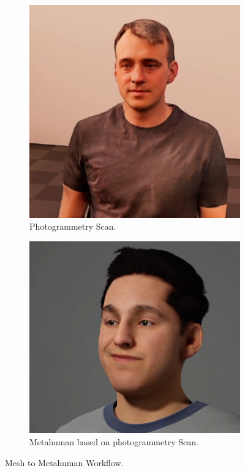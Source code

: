 \documentclass[
  a4paper,  %
  twoside,  %
  bibliography=totoc,
  headsepline,
  cleardoublepage=empty,
  parskip=half,
  draft=false
]{scrbook}
\begin{document}
\begin{figure}[h]
  \centering
  \begin{subfigure}[b]{0.45\textwidth}
    \includegraphics[width=\textwidth]{./graphics/unreal-engine/photogrammetry.png}
    \caption{Photogrammetry Scan.}
    \label{fig:head-photogrammetry-scan}
  \end{subfigure}
  \hfill
  \begin{subfigure}[b]{0.5\textwidth}
    \includegraphics[width=\textwidth]{./graphics/unreal-engine/Metahuman.png}
    \caption{Metahuman based on photogrammetry Scan.}
    \label{fig:metahuman-result}
  \end{subfigure}
  \caption{Mesh to Metahuman Workflow.}
  \label{fig:metahuman-comp}
\end{figure}
\end{document}
